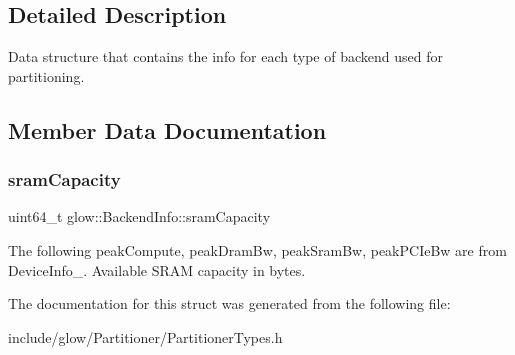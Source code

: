 \subsection{Detailed Description}
Data structure that contains the info for each type of backend used for partitioning. 

\subsection{Member Data Documentation}
\mbox{\label{structglow_1_1_backend_info_ad39dc08f2df27ed1e7b3ac543cb352d3}} 
\subsubsection{\texorpdfstring{sram\+Capacity}{sramCapacity}}
{\footnotesize\ttfamily uint64\+\_\+t glow\+::\+Backend\+Info\+::sram\+Capacity}

The following peak\+Compute, peak\+Dram\+Bw, peak\+Sram\+Bw, peak\+P\+C\+Ie\+Bw are from Device\+Info\+\_\+. Available S\+R\+AM capacity in bytes. 

The documentation for this struct was generated from the following file\+:\begin{DoxyCompactItemize}
\item 
include/glow/\+Partitioner/Partitioner\+Types.\+h\end{DoxyCompactItemize}
